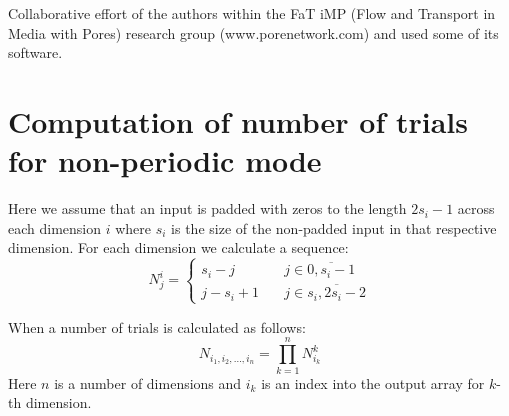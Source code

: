 \documentclass[1p]{elsarticle}
\begin{document}
Collaborative effort of the authors within the FaT iMP (Flow and Transport in
Media with Pores) research group (www.porenetwork.com) and used some of its
software.

\appendix
\section{Computation of number of trials for non-periodic mode}
\label{sec:number-of-trials}
Here we assume that an input is padded with zeros to the length $2s_i - 1$
across each dimension $i$ where $s_i$ is the size of the non-padded input in
that respective dimension. For each dimension we calculate a sequence:
\begin{equation*}
  N^i_j = \left\{
  \begin{array}{cc}
    s_i - j & \quad j \in \overline{0, s_i-1} \\
    j - s_i + 1 & \quad j \in \overline{s_i, 2s_i-2}
  \end{array}
  \right.
\end{equation*}

When a number of trials is calculated as follows:
\begin{equation*}
  N_{i_1, i_2, \dots, i_n} = \prod_{k=1}^n N^k_{i_k}
\end{equation*}
Here $n$ is a number of dimensions and $i_k$ is an index into the output array
for $k$-th dimension.


\end{document}
